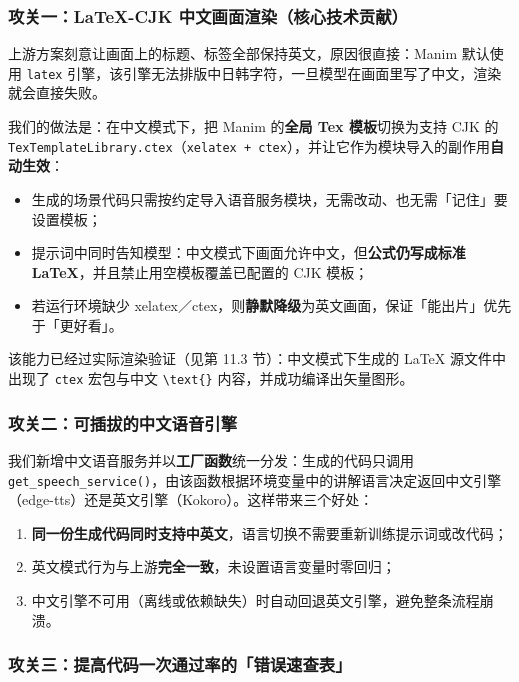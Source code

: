 \documentclass[11pt,a4paper]{ctexart}
\begin{document}
\subsubsection{攻关一：LaTeX-CJK 中文画面渲染（核心技术贡献）}

上游方案刻意让画面上的标题、标签全部保持英文，原因很直接：Manim 默认使用 \texttt{latex} 引擎，该引擎无法排版中日韩字符，一旦模型在画面里写了中文，渲染就会直接失败。

我们的做法是：在中文模式下，把 Manim 的\textbf{全局 Tex 模板}切换为支持 CJK 的 \texttt{TexTemplateLibrary.ctex}（\texttt{xelatex + ctex}），并让它作为模块导入的副作用\textbf{自动生效}：

\begin{itemize}
  \item 生成的场景代码只需按约定导入语音服务模块，无需改动、也无需「记住」要设置模板；
  \item 提示词中同时告知模型：中文模式下画面允许中文，但\textbf{公式仍写成标准 LaTeX}，并且禁止用空模板覆盖已配置的 CJK 模板；
  \item 若运行环境缺少 xelatex／ctex，则\textbf{静默降级}为英文画面，保证「能出片」优先于「更好看」。
\end{itemize}

该能力已经过实际渲染验证（见第 11.3 节）：中文模式下生成的 LaTeX 源文件中出现了 \texttt{ctex} 宏包与中文 \texttt{\textbackslash text\{\}} 内容，并成功编译出矢量图形。

\subsubsection{攻关二：可插拔的中文语音引擎}

我们新增中文语音服务并以\textbf{工厂函数}统一分发：生成的代码只调用 \texttt{get\_speech\_service()}，由该函数根据环境变量中的讲解语言决定返回中文引擎（edge-tts）还是英文引擎（Kokoro）。这样带来三个好处：

\begin{enumerate}
  \item \textbf{同一份生成代码同时支持中英文}，语言切换不需要重新训练提示词或改代码；
  \item 英文模式行为与上游\textbf{完全一致}，未设置语言变量时零回归；
  \item 中文引擎不可用（离线或依赖缺失）时自动回退英文引擎，避免整条流程崩溃。
\end{enumerate}

\subsubsection{攻关三：提高代码一次通过率的「错误速查表」}
\end{document}

